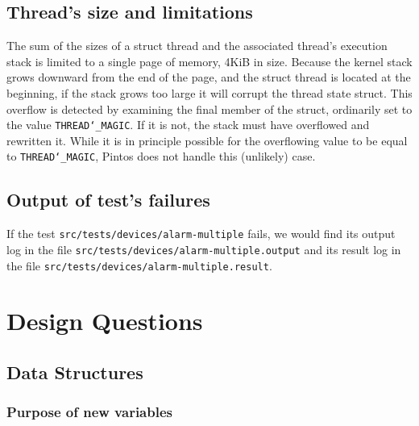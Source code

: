 \documentclass{article}
\renewcommand{\_}{\char`_}
\begin{document}
\subsection{Thread's size and limitations}
The sum of the sizes of a struct thread and the associated thread's
execution stack is limited to a single page of memory, 4KiB in size.
Because the kernel stack grows downward from the end of the page, and
the struct thread is located at the beginning, if the stack grows too
large it will corrupt the thread state struct.  This overflow is
detected by examining the final member of the struct, ordinarily set
to the value \texttt{THREAD\_MAGIC}.  If it is not, the stack must have
overflowed and rewritten it.  While it is in principle possible for
the overflowing value to be equal to \texttt{THREAD\_MAGIC}, Pintos does not
handle this (unlikely) case.

\subsection{Output of test's failures}
If the test \texttt{src/tests/devices/alarm-multiple} fails, we would find its output 
log in the file \newline \texttt{src/tests/devices/alarm-multiple.output} and its result log in the 
file \newline \texttt{src/tests/devices/alarm-multiple.result}.
\newpage

\section{Design Questions}
\subsection{Data Structures}
\subsubsection{Purpose of new variables}
\end{document}
